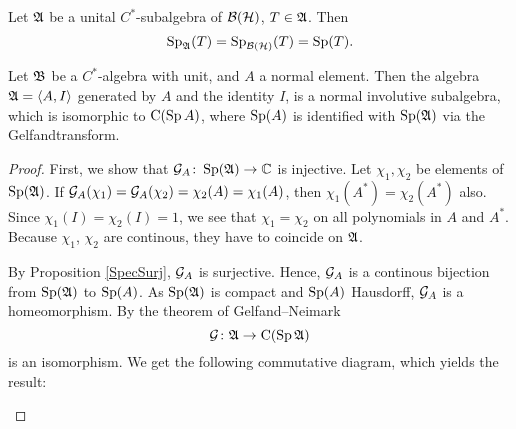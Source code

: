\begin{cor}
 Let $\mathfrak{A}$ be a unital $C^*$-subalgebra of $\mathcal{B}(\mathcal{H})$, $T \in \mathfrak{A}$. Then 
\[
 \operatorname{Sp}_{\mathfrak{A}} (T) = \operatorname{Sp}_{\mathcal{B}(\mathcal{H})}(T) = \operatorname{Sp}(T).
\]
\end{cor}

\begin{prop}\label{boundedfunccalc}
 Let $\mathfrak{B}$ be a $C^*$-algebra with unit, and $A$ a normal element.
 Then the algebra $\mathfrak{A} = \left\langle A, I \right\rangle$ generated by $A$ and the identity $I$, is a
 normal involutive subalgebra, which is isomorphic to 
 $\operatorname{C} (\operatorname{Sp} A)$, where $\operatorname{Sp}(A)$ is identified with $\operatorname{Sp}(\mathfrak{A})$ via the Gelfandtransform.
\end{prop}

\begin{proof}
 First, we show that $\mathcal{G}_A \colon \operatorname{Sp}(\mathfrak{A}) \to \mathbb{C}$ is injective. Let 
 $\chi_1 , \chi_2$ be elements of $\operatorname{Sp}(\mathfrak{A})$. If $\mathcal{G}_A(\chi_1) = \mathcal{G}_A(\chi_2)=
 \chi_2(A)=\chi_1(A)$, then $\chi_1(A^*)=\chi_2(A^*)$ also. Since 
 $\chi_1(I)=\chi_2(I)=1$, we see that $\chi_1 = \chi_2$ on all polynomials
 in $A$ and $A^*$. Because $\chi_1$, $\chi_2$ are continous, they have to coincide on
 $\mathfrak{A}$. 
 
 By Proposition \ref{SpecSurj}, $\mathcal{G}_A$ is surjective. Hence, $\mathcal{G}_A$ is a continous bijection 
 from $\operatorname{Sp}(\mathfrak{A})$ to $\operatorname{Sp}(A)$. As $\operatorname{Sp}(\mathfrak{A})$ is compact and $\operatorname{Sp}(A)$ Hausdorff,
 $\mathcal{G}_A$ is a homeomorphism.
By the theorem of Gelfand--Neimark 
\[
 \mathcal{G} \colon \mathfrak{A} \to \operatorname{C}(\operatorname{Sp} \mathfrak{A})
\]
is an isomorphism. We get the following commutative diagram, which yields the result:

% 
% 
%  
% 
%   
\pagebreak
 \begin{center}
\end{center}
\end{proof}
